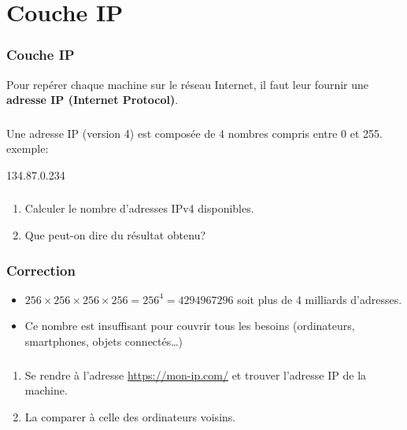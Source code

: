 \documentclass[svgnames,11pt]{beamer}
\begin{document}
\section{Couche IP}
\begin{frame}
    \frametitle{Couche IP}

    \begin{aretenir}[]
    Pour repérer chaque machine sur le réseau Internet, il faut leur fournir une \textbf{adresse IP (Internet Protocol)}.
    \end{aretenir}

\end{frame}
\begin{frame}
    \frametitle{}

    \begin{aretenir}[]
    Une adresse IP (version 4) est composée de 4 nombres compris entre 0 et 255. exemple:
    \begin{center}
        134.87.0.234
    \end{center}
    \end{aretenir}

\end{frame}
\begin{frame}
    \frametitle{}

    \begin{activite}
    \begin{enumerate}
        \item Calculer le nombre d'adresses IPv4 disponibles.
        \item Que peut-on dire du résultat obtenu?
    \end{enumerate}
    \end{activite}

\end{frame}
\begin{frame}
    \frametitle{Correction}

    \begin{itemize}
        \item<1-> $256×256×256×256=256^4=4294967296$ soit plus de 4 milliards d'adresses.
        \item <2-> Ce nombre est insuffisant pour couvrir tous les besoins (ordinateurs, smartphones, objets connectés\dots)
    \end{itemize}

\end{frame}
\begin{frame}
    \frametitle{}

    \begin{activite}
    \begin{enumerate}
        \item Se rendre à l'adresse \url{https://mon-ip.com/} et trouver l'adresse IP de la machine.
        \item La comparer à celle des ordinateurs voisins.
    \end{enumerate}
    \end{activite}

\end{frame}
\end{document}
